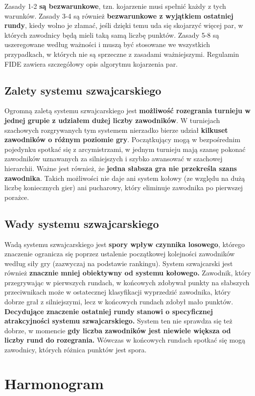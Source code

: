 Zasady 1-2 \textbf{są bezwarunkowe}, tzn. kojarzenie musi spełnić każdy z tych warunków. Zasady 3-4 są również \textbf{bezwarunkowe z wyjątkiem ostatniej rundy}, kiedy wolno je złamać, jeśli dzięki temu uda się skojarzyć więcej par, w których zawodnicy będą mieli taką samą liczbę punktów. Zasady 5-8 są uszeregowane według ważności i muszą być stosowane we wszystkich przypadkach, w których nie są sprzeczne z zasadami ważniejszymi. Regulamin FIDE zawiera szczegółowy opis algorytmu kojarzenia par.

\subsection{Zalety systemu szwajcarskiego}
Ogromną zaletą systemu szwajcarskiego jest \textbf{możliwość rozegrania turnieju w jednej grupie z udziałem dużej liczby zawodników}. W turniejach szachowych rozgrywanych tym systemem nierzadko bierze udział \textbf{kilkuset zawodników o różnym poziomie gry}. Początkujący mogą w bezpośrednim pojedynku spotkać się z arcymistrzami, w jednym turnieju mają szansę pokonać zawodników uznawanych za silniejszych i szybko awansować w szachowej hierarchii. Ważne jest również, że \textbf{jedna słabsza gra nie przekreśla szans zawodnika}. Takich możliwości nie daje ani system kołowy (ze względu na dużą liczbę koniecznych gier) ani pucharowy, który eliminuje zawodnika po pierwszej porażce.

\subsection{Wady systemu szwajcarskiego}
Wadą systemu szwajcarskiego jest \textbf{spory wpływ czynnika losowego}, którego znaczenie ogranicza się poprzez ustalenie początkowej kolejności zawodników według siły gry (zazwyczaj na podstawie rankingu). System szwajcarski jest również \textbf{znacznie mniej obiektywny od systemu kołowego.} Zawodnik, który przegrywając w pierwszych rundach, w końcowych zdobywał punkty na słabszych przeciwnikach może w ostatecznej klasyfikacji wyprzedzić zawodnika, który dobrze grał z silniejszymi, lecz w końcowych rundach zdobył mało punktów. \textbf{Decydujące znaczenie ostatniej rundy stanowi o specyficznej atrakcyjności systemu szwajcarskiego.}
System ten nie sprawdza się też dobrze, w momencie \textbf{gdy liczba zawodników jest niewiele większa od liczby rund do rozegrania.} Wówczas w końcowych rundach spotkać się mogą zawodnicy, których różnica punktów jest spora.

\section{Harmonogram}
